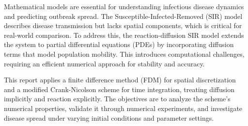 Mathematical models are essential for understanding infectious disease dynamics and predicting outbreak spread. 
The Susceptible-Infected-Removed (SIR) model describes disease transmission but lacks spatial components, 
which is critical for real-world comparison. To address this, the reaction-diffusion SIR model extends 
the system to partial differential equations (PDEs) by incorporating diffusion terms that model population 
mobility. This introduces computational challenges, requiring an efficient numerical approach for stability 
and accuracy.  

This report applies a finite difference method (FDM) for spatial discretization and a modified Crank-Nicolson 
scheme for time integration, treating diffusion implicitly and reaction explicitly. The objectives are to 
analyze the scheme’s numerical properties, validate it through numerical experiments, and investigate disease 
spread under varying initial conditions and parameter settings.
